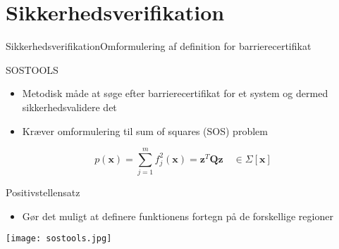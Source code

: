 \section{Sikkerhedsverifikation}
\begin{frame}{Sikkerhedsverifikation}{Omformulering af definition for barrierecertifikat}
	\vspace{3mm}
\begin{block}{SOSTOOLS}
	\begin{itemize}
		\item Metodisk måde at søge efter barrierecertifikat for et system og dermed sikkerhedsvalidere det
		\item Kræver omformulering til sum of squares (SOS) problem
	\end{itemize}
\begin{equation*}
p(\mathbf{x})=\sum\limits_{j=1}^{m}f_j^2(\mathbf{x})=\mathbf{z}^T\mathbf{Q}\mathbf{z}\quad \in\Sigma[\mathbf{x}]
\end{equation*}
\end{block}
	\vspace{-8mm}
\begin{minipage}[b]{0.57\linewidth}
	\phantom{.}
	\vspace*{6mm}
\begin{block}{Positivstellensatz}
	\begin{itemize}
		\item Gør det muligt at definere funktionens fortegn på de forskellige regioner
	\end{itemize}
	\vspace{5mm}
\end{block}
\end{minipage}
\hspace{1mm}
\begin{minipage}[b]{0.35\linewidth}
	\vspace{3mm}
	\texttt{[image: sostools.jpg]}
\end{minipage}
\end{frame}


